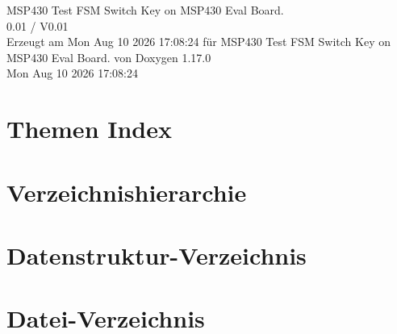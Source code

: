 \documentclass[twoside]{book}
\newcommand{\+}{\discretionary{\mbox{\scriptsize$\hookleftarrow$}}{}{}}
\newcommand{\clearemptydoublepage}{%
    \newpage{\pagestyle{empty}\cleardoublepage}%
  }
\begin{document}
  \raggedbottom
    \hypersetup{pageanchor=false,
                bookmarksnumbered=true,
                pdfencoding=unicode
               }
  \begin{titlepage}
  \vspace*{7cm}
  \begin{center}%
  {\Large MSP430 Test FSM Switch Key on MSP430 Eval Board.}\\
  [1ex]\large 0.\+01 /\+ V0.\+01 \\
  \vspace*{1cm}
  {\large Erzeugt am Mon Aug 10 2026 17:\+08:\+24 für MSP430 Test FSM Switch Key on MSP430 Eval Board. von Doxygen 1.17.0}\\
    \vspace*{0.5cm}
    {\small Mon Aug 10 2026 17:08:24}
  \end{center}
  \end{titlepage}
  \clearemptydoublepage
  \tableofcontents
  \clearemptydoublepage
  \hypersetup{pageanchor=true}


\chapter{Themen Index}

\chapter{Verzeichnishierarchie}

\chapter{Datenstruktur-\/\+Verzeichnis}

\chapter{Datei-\/\+Verzeichnis}

\end{document}
